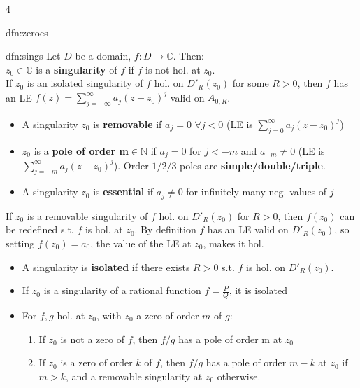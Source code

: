 \documentclass[landscape, 8pt]{extarticle}
\begin{document}
\begin{multicols*}{4}
\begin{dfn}[Zeroes]{dfn:zeroes}{ }
\begin{itemize}
			\end{itemize}
			
		\end{dfn}
		
		
		\begin{dfn}{dfn:sings}{ }
			Let $D$ be a domain, $f:D \to \mathbb{C}$. Then:\\
			$z_0 \in \mathbb{C}$ is a \textbf{singularity} of $f$ if $f$ is not hol. at $z_0$.\\			
			If $z_0$ is an isolated singularity of $f$ hol. on $D'_R(z_0)$ for some $R> 0$, then $f$ has an LE $f(z) = \sum_{j= -\infty}^{\infty}a_j(z-z_0)^j$ valid on $A_{0, R}$.
			\begin{itemize}[label=*]
				\item A singularity $z_0$ is \textbf{removable} if $a_j = 0$ $\forall j < 0$ (LE is $\sum_{j=0}^{\infty}a_j(z-z_0)^j$)
				\item $z_0$ is a \textbf{pole of order m}$\in \mathbb{N}$ if $a_j = 0$ for $j < -m$ and $a_{-m} \ne 0$ (LE is $\sum_{j= -m}^{\infty}a_j(z-z_0)^j$). Order $1/2/3$ poles are \textbf{simple/double/triple}.
				\item A singularity $z_0$ is \textbf{essential} if $a_j \ne 0$ for infinitely many neg. values of $j$
				
			\end{itemize}
			
			If $z_0$ is a removable singularity of $f$ hol. on $D'_R(z_0)$ for $R > 0$, then $f(z_0)$ can be redefined s.t. $f$ is hol. at $z_0$. By definition $f$ has an LE valid on $D'_R(z_0)$, so setting $f(z_0) = a_0$, the value of the LE at $z_0$, makes it hol.
			
			\begin{itemize}
				\item A singularity is \textbf{isolated} if there exists $R > 0$ s.t. $f$ is hol. on $D'_R(z_0)$.
				\item If $z_0$ is a singularity of a rational function $f = \frac{P}{Q}$, it is isolated
				\item For $f, g$ hol. at $z_0$, with $z_0$ a zero of order $m$ of $g$:
				\begin{enumerate}[label=(\roman*)]
					\item If $z_0$ is not a zero of $f$, then $f/g$ has a pole of order m at $z_0$
					\item If $z_0$ is a zero of order $k$ of $f$, then $f/g$ has a pole of order $m-k$ at $z_0$ if $m>k$, and a removable singularity at $z_0$ otherwise.
				\end{enumerate}
			\end{itemize}
			

\end{dfn}
\end{multicols*}
\end{document}
